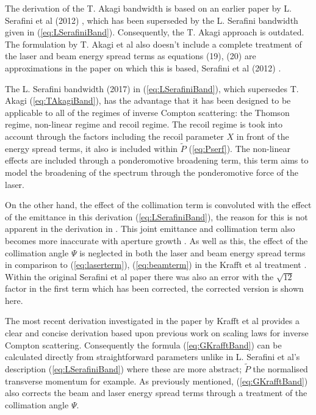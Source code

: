 \documentclass[11pt]{article}
\begin{document}
The derivation of the T. Akagi bandwidth is based on an earlier paper by L. Serafini et al (2012) \cite{Serafini2012}, which has been superseded by the L. Serafini bandwidth \cite{SerafiniAnalytical} given in (\ref{eq:LSerafiniBand}). Consequently, the T. Akagi approach is outdated. The formulation by T. Akagi et al also doesn't include a complete treatment of the laser and beam energy spread terms as equations (19), (20) are approximations in the paper on which this is based, Serafini et al (2012) \cite{Serafini2012}. 

The L. Serafini bandwidth (2017) in (\ref{eq:LSerafiniBand}), which supersedes T. Akagi (\ref{eq:TAkagiBand}), has the advantage that it has been designed to be applicable to all of the regimes of inverse Compton scattering: the Thomson regime, non-linear regime and recoil regime. The recoil regime is took into account through the factors including the recoil parameter $X$ in front of the energy spread terms, it also is included within $\tilde{P}$ (\ref{eq:Pserf}). The non-linear effects are included through a ponderomotive broadening term, this term aims to model the broadening of the spectrum through the ponderomotive force of the laser.

On the other hand, the effect of the collimation term is convoluted with the effect of the emittance in this derivation (\ref{eq:LSerafiniBand}), the reason for this is not apparent in the derivation in \cite{SerafiniAnalytical}. This joint emittance and collimation term also becomes more inaccurate with aperture growth \cite{SerafiniAnalytical}. As well as this, the effect of the collimation angle $\Psi$ is neglected in both the laser and beam energy spread terms in comparison to (\ref{eq:laserterm}), (\ref{eq:beamterm}) in the Krafft et al treatment \cite{KrafftBand}. Within the original Serafini et al paper \cite{SerafiniAnalytical} there was also an error with the $\sqrt{12}$ factor in the first term which has been corrected, the corrected version is shown here.
 
The most recent derivation investigated in the paper by Krafft et al \cite{KrafftBand} provides a clear and concise derivation based upon previous work on scaling laws for inverse Compton scattering. Consequently the formula (\ref{eq:GKrafftBand}) can be calculated directly from straightforward parameters unlike in L. Serafini et al's description (\ref{eq:LSerafiniBand}) where these are more abstract; $\tilde{P}$ the normalised transverse momentum for example. As previously mentioned, (\ref{eq:GKrafftBand}) also corrects the beam and laser energy spread terms through a treatment of the collimation angle $\Psi$.
\end{document}

